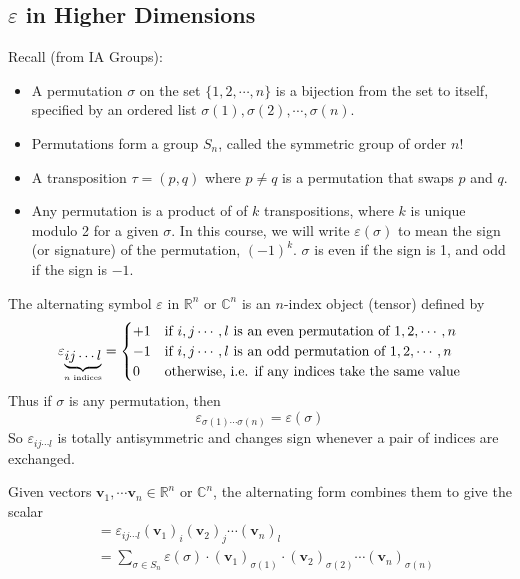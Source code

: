 \documentclass{article}
\begin{document}
\subsection{$\varepsilon$ in Higher Dimensions}
Recall (from IA Groups):
\begin{itemize}
	\item A permutation $\sigma$ on the set $\{ 1, 2, \cdots, n \}$ is a bijection from the set to itself, specified by an ordered list $\sigma(1), \sigma(2), \cdots, \sigma(n)$.
	\item Permutations form a group $S_n$, called the symmetric group of order $n!$
	\item A transposition $\tau = (p, q)$ where $p \neq q$ is a permutation that swaps $p$ and $q$.
	\item Any permutation is a product of of $k$ transpositions, where $k$ is unique modulo 2 for a given $\sigma$. In this course, we will write $\varepsilon(\sigma)$ to mean the sign (or signature) of the permutation, $(-1)^k$. $\sigma$ is even if the sign is 1, and odd if the sign is $-1$.
\end{itemize}
The alternating symbol $\varepsilon$ in $\mathbb R^n$ or $\mathbb C^n$ is an $n$-index object (tensor) defined by
\[ \varepsilon_{\underbrace{ij\cdots l}_{\mathclap{n \text{ indices}}}} = \begin{cases}
		+1 & \text{if } i, j \cdots, l \text{ is an even permutation of } 1, 2, \cdots, n \\
		-1 & \text{if } i, j \cdots, l \text{ is an odd permutation of } 1, 2, \cdots, n  \\
		0  & \text{otherwise, i.e. if any indices take the same value}
	\end{cases} \]
Thus if $\sigma$ is any permutation, then
\[ \varepsilon_{\sigma(1)\cdots\sigma(n)} = \varepsilon(\sigma) \]
So $\varepsilon_{ij\cdots l}$ is totally antisymmetric and changes sign whenever a pair of indices are exchanged.
\begin{definition}
	Given vectors $\bm v_1, \cdots \bm v_n \in \mathbb R^n$ or $\mathbb C^n$, the alternating form combines them to give the scalar
	\begin{align*}
		[\bm v_1, \bm v_2, \cdots, \bm v_n ] & = \varepsilon_{ij\cdots l} (\bm v_1)_i (\bm v_2)_j \cdots (\bm v_n)_l                                                            \\
		                                     & = \sum_{\sigma \in S_n} \varepsilon(\sigma) \cdot (\bm v_1)_{\sigma(1)} \cdot (\bm v_2)_{\sigma(2)} \cdots (\bm v_n)_{\sigma(n)}
	\end{align*}
\end{definition}
\end{document}
